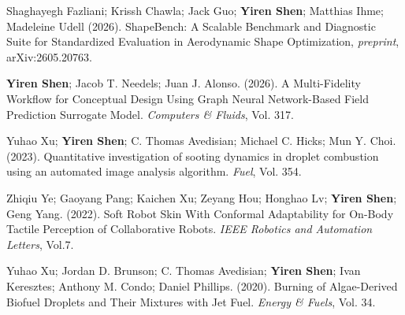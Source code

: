 
\vspace{10pt}
\begin{cvitems}
\setlength{\itemsep}{1em} %
\paragraphstyle

\item Shaghayegh Fazliani; Krissh Chawla; Jack Guo; \textbf{Yiren Shen}; Matthias Ihme; Madeleine Udell (2026). ShapeBench: A Scalable Benchmark and Diagnostic Suite for Standardized Evaluation in Aerodynamic Shape Optimization, \textit{preprint}, arXiv:2605.20763.
\end{cvitems}
\vspace{20pt}
\vspace{10pt}
\begin{cvitems}
\setlength{\itemsep}{1em} %
\paragraphstyle
\item \textbf{Yiren Shen}; Jacob T. Needels; Juan J. Alonso. (2026). A Multi-Fidelity Workflow for Conceptual Design Using Graph Neural Network-Based Field Prediction Surrogate Model. \textit{Computers \& Fluids}, Vol. 317.

\item Yuhao Xu; \textbf{Yiren Shen}; C. Thomas Avedisian; Michael C. Hicks; Mun Y. Choi. (2023). Quantitative investigation of sooting dynamics in droplet combustion using an automated image analysis algorithm. \textit{Fuel}, Vol. 354. 
\item Zhiqiu Ye; Gaoyang Pang; Kaichen Xu; Zeyang Hou; Honghao Lv; \textbf{Yiren Shen}; Geng Yang. (2022). Soft Robot Skin With Conformal Adaptability for On-Body Tactile Perception of Collaborative Robots. \textit{IEEE Robotics and Automation Letters}, Vol.7.
\item Yuhao Xu; Jordan D. Brunson; C. Thomas Avedisian; \textbf{Yiren Shen}; Ivan Keresztes; Anthony M. Condo; Daniel Phillips. (2020). Burning of Algae-Derived Biofuel Droplets and Their Mixtures with Jet Fuel. \textit{Energy \& Fuels}, Vol. 34.
\end{cvitems}
\vspace{20pt}
\vspace{10pt}
